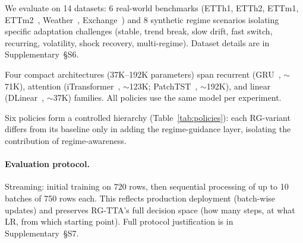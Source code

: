 \documentclass[journal]{IEEEtran}
\begin{document}
We evaluate on 14 datasets: 6 real-world benchmarks (ETTh1, ETTh2, ETTm1, ETTm2~\cite{zhou2021informer}, Weather~\cite{wu2021autoformer}, Exchange~\cite{lai2018modeling}) and 8 synthetic regime scenarios isolating specific adaptation challenges (stable, trend break, slow drift, fast switch, recurring, volatility, shock recovery, multi-regime). Dataset details are in Supplementary~\S{S6}.

Four compact architectures (37K--192K parameters) span recurrent (GRU~\cite{cho2014gru}, $\sim$71K), attention (iTransformer~\cite{liu2024itransformer}, $\sim$123K; PatchTST~\cite{nie2023patchtst}, $\sim$192K), and linear (DLinear~\cite{zeng2023dlinear}, $\sim$37K) families. All policies use the same model per experiment.

Six policies form a controlled hierarchy (Table~\ref{tab:policies}): each RG-variant differs from its baseline only in adding the regime-guidance layer, isolating the contribution of regime-awareness.

\begin{table}[t]
\centering
\caption{The 6 update policies. Policies 1--3 are baselines; 4--6 are our contributions.}
\label{tab:policies}
\small
{}%
\end{table}

\paragraph{Evaluation protocol.} Streaming: initial training on 720 rows, then sequential processing of up to 10 batches of 750 rows each. This reflects production deployment (batch-wise updates) and preserves RG-TTA's full decision space (how many steps, at what LR, from which starting point). Full protocol justification is in Supplementary~\S{S7}.
\end{document}
